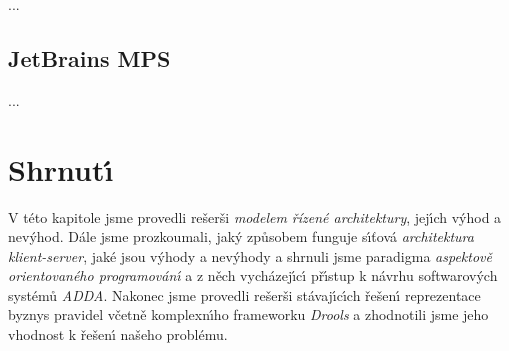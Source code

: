 ...

\subsection{JetBrains MPS}


...

\section{Shrnut\'{\i}}

V této kapitole jsme provedli rešerši \textit{modelem řízené architektury},
jej\'{\i}ch v\'yhod a nev\'yhod. Dále jsme prozkoumali, jak\'y způsobem funguje
s\'{\i}ťová \textit{architektura klient-server}, jaké jsou v\'yhody a nev\'yhody
a shrnuli jsme paradigma \textit{aspektově orientovaného programován\'{\i}} a
z něch vycházej\'{\i}c\'{\i} př\'{\i}stup k návrhu softwarov\'ych systémů \textit{ADDA}.
Nakonec jsme provedli rešerši stávaj\'{\i}c\'{\i}ch řešen\'{\i} reprezentace byznys pravidel
včetně komplexn\'{\i}ho frameworku \textit{Drools} a zhodnotili jsme jeho vhodnost
k řešen\'{\i} našeho problému. %
